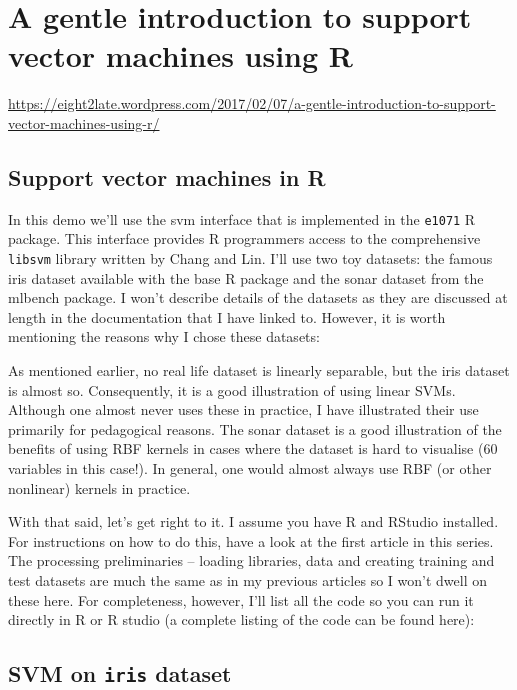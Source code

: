 \documentclass[]{book}
\begin{document}
\hypertarget{a-gentle-introduction-to-support-vector-machines-using-r-1}{%
\chapter{A gentle introduction to support vector machines using R}\label{a-gentle-introduction-to-support-vector-machines-using-r-1}}

\url{https://eight2late.wordpress.com/2017/02/07/a-gentle-introduction-to-support-vector-machines-using-r/}

\hypertarget{support-vector-machines-in-r-1}{%
\section{Support vector machines in R}\label{support-vector-machines-in-r-1}}

In this demo we'll use the svm interface that is implemented in the \texttt{e1071} R package. This interface provides R programmers access to the comprehensive \texttt{libsvm} library written by Chang and Lin. I'll use two toy datasets: the famous iris dataset available with the base R package and the sonar dataset from the mlbench package. I won't describe details of the datasets as they are discussed at length in the documentation that I have linked to. However, it is worth mentioning the reasons why I chose these datasets:

As mentioned earlier, no real life dataset is linearly separable, but the iris dataset is almost so. Consequently, it is a good illustration of using linear SVMs. Although one almost never uses these in practice, I have illustrated their use primarily for pedagogical reasons.
The sonar dataset is a good illustration of the benefits of using RBF kernels in cases where the dataset is hard to visualise (60 variables in this case!). In general, one would almost always use RBF (or other nonlinear) kernels in practice.

With that said, let's get right to it. I assume you have R and RStudio installed. For instructions on how to do this, have a look at the first article in this series. The processing preliminaries -- loading libraries, data and creating training and test datasets are much the same as in my previous articles so I won't dwell on these here. For completeness, however, I'll list all the code so you can run it directly in R or R studio (a complete listing of the code can be found here):

\hypertarget{svm-on-iris-dataset-1}{%
\section{\texorpdfstring{SVM on \texttt{iris} dataset}{SVM on iris dataset}}\label{svm-on-iris-dataset-1}}
\end{document}
